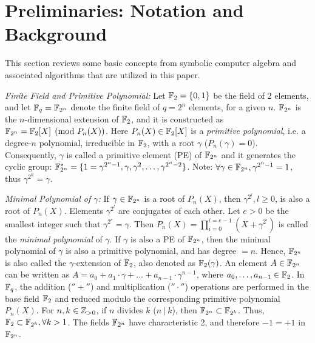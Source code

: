 \section{Preliminaries: Notation and Background}\label{sec:prelim}
This section reviews some basic concepts from symbolic computer
algebra and associated algorithms that are utilized in this paper. 

{\it Finite Field and Primitive Polynomial:}
Let ${\mathbb{F}}_2=\{0,1\}$ be the field of 2 elements, and let ${\mathbb{F}}_q =
{\mathbb{F}}_{2^n}$ denote the finite 
field of $q=2^n$ elements, for a given $n$. ${\mathbb{F}}_{2^n}$ is the
$n$-dimensional extension of ${\mathbb{F}}_2$, and it is constructed as ${\mathbb{F}}_{2^n} =
{\mathbb{F}}_2[X]\pmod{ P_n(X)}$. Here $P_n(X) \in {\mathbb{F}}_2[X]$ is a {\it primitive
  polynomial}, i.e. a degree-$n$ polynomial, irreducible in
${\mathbb{F}}_2$, with a root $\gamma$ ($P_n(\gamma)=0$). 
Consequently, $\gamma$ is called a primitive element (PE) of ${\mathbb{F}}_{2^n}$ and
it generates the cyclic group: ${\mathbb{F}}_{2^n}^*=\{1=\gamma^{2^n - 1}, \gamma,
\gamma^2,\dots,\gamma^{2^n - 2}\}$. Note: $\forall \gamma\in {\mathbb{F}}_{2^n},
\gamma^{2^n-1}=1$, thus $\gamma^{2^n}=\gamma$.

{\it Minimal Polynomial of $\gamma$:} If $\gamma \in {\mathbb{F}}_{2^n}$ is a root
of $P_n(X)$, then $\gamma^{2^l},l\geq 0$, is also a root of
$P_n(X)$. Elements $\gamma^{2^l}$ are conjugates of each other. Let
$e>0$ be the smallest integer such that $\gamma^{2^e} = \gamma$. Then
$P_n(X)=\prod_{i=0}^{i=e-1}(X+\gamma^{2^i})$ is called the {\it
  minimal polynomial} of $\gamma$. If $\gamma$ is also a PE of ${\mathbb{F}}_{2^n}$,
then the minimal polynomial of $\gamma$ is also a primitive
polynomial, and has degree $=n$. Hence, ${\mathbb{F}}_{2^n}$ is also called the
$\gamma$-extension of ${\mathbb{F}}_2$, also denoted as ${\mathbb{F}}_2(\gamma)$. 
An element $A \in {\mathbb{F}}_{2^n}$ can be written as $A = a_0 + a_1\cdot \gamma +
\dots + a_{n-1}\cdot\gamma^{n-1}$, where $a_0,\dots,a_{n-1} \in
{\mathbb{F}}_2$. 
In ${\mathbb{F}}_{q}$, the addition ($''+''$) and multiplication
($''\cdot''$) operations are performed in the base field ${\mathbb{F}}_2$ and
reduced modulo the corresponding primitive polynomial $P_n(X)$. 
For $n, k \in {\mathbb{Z}}_{> 0}$, if $n$ divides $k$ ($n ~|~ k$), then ${\mathbb{F}}_{2^n} \subset
{\mathbb{F}}_{2^k}$. 
Thus, ${\mathbb{F}}_2 \subset {\mathbb{F}}_{2^k}, \forall k>1$. 
The fields ${\mathbb{F}}_{2^n}$ have
characteristic 2, and therefore $-1 = +1$ in ${\mathbb{F}}_{2^n}$. 


